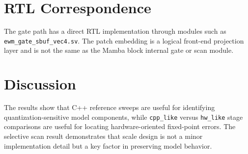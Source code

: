 \section{RTL Correspondence}

The gate path has a direct RTL implementation through modules such as \texttt{ewm\_gate\_sbuf\_vec4.sv}. The patch embedding is a logical front-end projection layer and is not the same as the Mamba block internal gate or scan module.

\section{Discussion}

The results show that C++ reference sweeps are useful for identifying quantization-sensitive model components, while \texttt{cpp\_like} versus \texttt{hw\_like} stage comparisons are useful for locating hardware-oriented fixed-point errors. The selective scan result demonstrates that scale design is not a minor implementation detail but a key factor in preserving model behavior.

